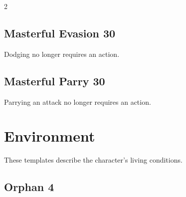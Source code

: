 \begin{multicols}{2}
\begin{tcolorbox}
\vspace{3mm}



\end{tcolorbox}

\begin{tcolorbox}
    \subsection*{Masterful Evasion \hfill \small{30 }}
    \tcblower
Dodging no longer requires an action.


\vspace{3mm}



\end{tcolorbox}

\begin{tcolorbox}
    \subsection*{Masterful Parry \hfill \small{30 }}
    \tcblower
Parrying an attack no longer requires an action.


\vspace{3mm}



\end{tcolorbox}

\section{Environment}

These templates describe the character's living conditions.

\begin{tcolorbox}
    \subsection*{Orphan \hfill \small{4 }}
    \tcblower





\end{tcolorbox}
\end{multicols}

